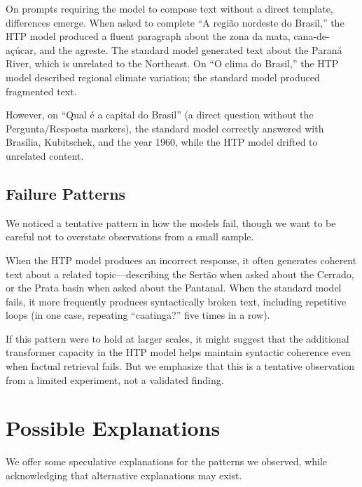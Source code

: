 \documentclass[10pt,twocolumn,a4paper]{article}
\newcommand{\htpname}{HTP}
\begin{document}
On prompts requiring the model to compose text without a direct template, differences emerge. When asked to complete ``A regi\~ao nordeste do Brasil,'' the \htpname{} model produced a fluent paragraph about the zona da mata, cana-de-a\c{c}\'ucar, and the agreste. The standard model generated text about the Paran\'a River, which is unrelated to the Northeast. On ``O clima do Brasil,'' the \htpname{} model described regional climate variation; the standard model produced fragmented text.

However, on ``Qual \'e a capital do Brasil'' (a direct question without the Pergunta/Resposta markers), the standard model correctly answered with Bras\'ilia, Kubitschek, and the year 1960, while the \htpname{} model drifted to unrelated content.

\subsection{Failure Patterns}

We noticed a tentative pattern in how the models fail, though we want to be careful not to overstate observations from a small sample.

When the \htpname{} model produces an incorrect response, it often generates coherent text about a related topic---describing the Sert\~ao when asked about the Cerrado, or the Prata basin when asked about the Pantanal. When the standard model fails, it more frequently produces syntactically broken text, including repetitive loops (in one case, repeating ``caatinga?'' five times in a row).

If this pattern were to hold at larger scales, it might suggest that the additional transformer capacity in the \htpname{} model helps maintain syntactic coherence even when factual retrieval fails. But we emphasize that this is a tentative observation from a limited experiment, not a validated finding.

\section{Possible Explanations}
\label{sec:interpretation}

We offer some speculative explanations for the patterns we observed, while acknowledging that alternative explanations may exist.
\end{document}
